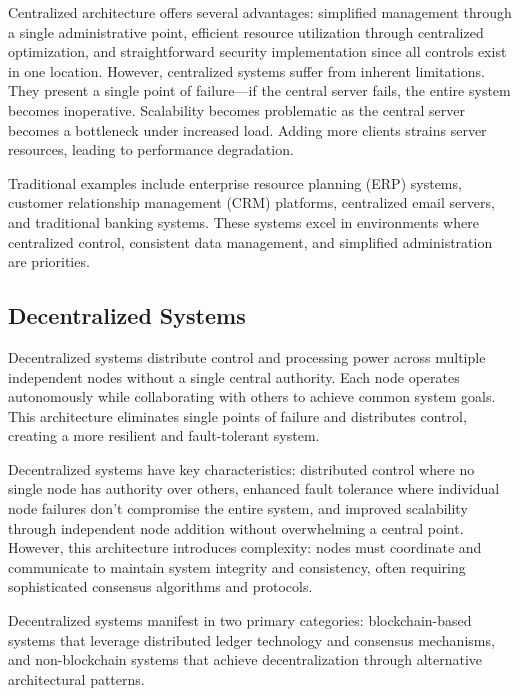 Centralized architecture offers several advantages: simplified management through a single administrative point, efficient resource utilization through centralized optimization, and straightforward security implementation since all controls exist in one location. However, centralized systems suffer from inherent limitations. They present a single point of failure---if the central server fails, the entire system becomes inoperative. Scalability becomes problematic as the central server becomes a bottleneck under increased load. Adding more clients strains server resources, leading to performance degradation.

Traditional examples include enterprise resource planning (ERP) systems, customer relationship management (CRM) platforms, centralized email servers, and traditional banking systems. These systems excel in environments where centralized control, consistent data management, and simplified administration are priorities.

\subsection{Decentralized Systems}
\label{subsec:decentralized}

Decentralized systems distribute control and processing power across multiple independent nodes without a single central authority. Each node operates autonomously while collaborating with others to achieve common system goals. This architecture eliminates single points of failure and distributes control, creating a more resilient and fault-tolerant system.

Decentralized systems have key characteristics: distributed control where no single node has authority over others, enhanced fault tolerance where individual node failures don't compromise the entire system, and improved scalability through independent node addition without overwhelming a central point. However, this architecture introduces complexity: nodes must coordinate and communicate to maintain system integrity and consistency, often requiring sophisticated consensus algorithms and protocols.

Decentralized systems manifest in two primary categories: blockchain-based systems that leverage distributed ledger technology and consensus mechanisms, and non-blockchain systems that achieve decentralization through alternative architectural patterns.

